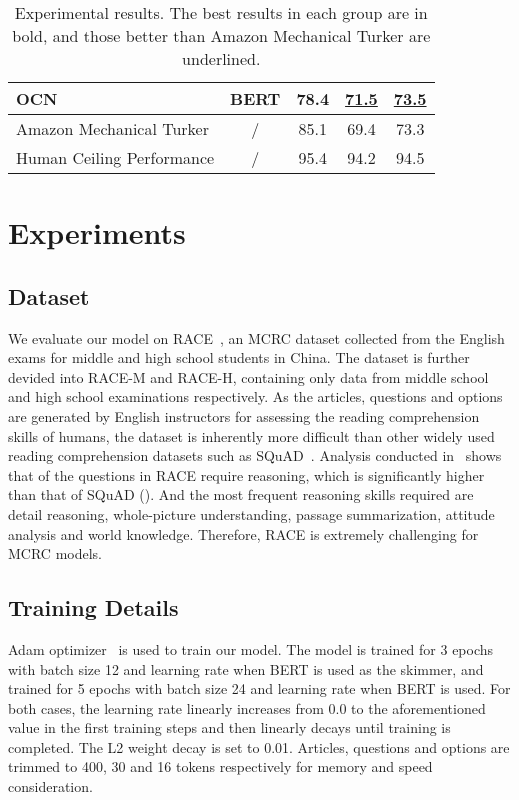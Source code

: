 \documentclass[11pt,a4paper]{article}
\newcommand\BERTBASE{BERT\xspace}
\newcommand\BERTLARGE{BERT\xspace}
\newcommand\OCNLARGE{OCN\xspace}
\begin{document}
\begin{table*}
\begin{tabular}{lcccc}
		\OCNLARGE & BERT & {\bf 78.4} & {\bf \underline{71.5}} & {\bf \underline{73.5}} \\
		\midrule Amazon Mechanical Turker & / & 85.1 & 69.4 & 73.3 \\
		Human Ceiling Performance & / & 95.4 & 94.2 & 94.5 \\
		\bottomrule
	\end{tabular}
	\caption{Experimental results. The best results in each group are in bold, and those better than Amazon Mechanical Turker are underlined.}
	\label{tab:results}
	\vspace{-1em}
\end{table*}

\section{Experiments}
\subsection{Dataset}



We evaluate our model on RACE~\cite{RACE}, an MCRC dataset collected from the English exams for middle and high school students in China. The dataset is further devided into RACE-M and RACE-H, containing only data from middle school and high school examinations respectively. As the articles, questions and options are generated by English instructors for assessing the reading comprehension skills of humans, the dataset is inherently more difficult than other widely used reading comprehension datasets such as SQuAD~\cite{squad}. Analysis conducted in~\cite{RACE} shows that  of the questions in RACE require reasoning, which is significantly higher than that of SQuAD (). And the most frequent reasoning skills required are detail reasoning, whole-picture understanding, passage summarization, attitude analysis and world knowledge. Therefore, RACE is extremely challenging for MCRC models.

\subsection{Training Details}

Adam optimizer~\cite{adam} is used to train our model. 
The model is trained for 3 epochs with batch size 12 and learning rate  when \BERTBASE is used as the skimmer, and trained for 5 epochs with batch size 24 and learning rate  when \BERTLARGE is used.
For both cases, the learning rate linearly increases from 0.0 to the aforementioned value in the first  training steps and then linearly decays until training is completed. The L2 weight decay  is set to 0.01. Articles, questions and options are trimmed to 400, 30 and 16 tokens respectively for memory and speed consideration.
\end{document}
